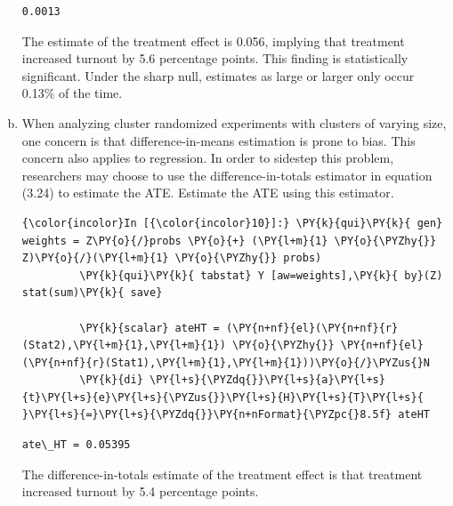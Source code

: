 \documentclass[11pt,notitlepage]{article}\usepackage[]{graphicx}\usepackage[]{color}
\makeatletter
\newenvironment{kframe}{%
 \def\at@end@of@kframe{}%
 \ifinner\ifhmode%
  \def\at@end@of@kframe{\end{minipage}}%
  \begin{minipage}{\columnwidth}%
 \fi\fi%
 \def\FrameCommand##1{\hskip\@totalleftmargin \hskip-\fboxsep
 \colorbox{shadecolor}{##1}\hskip-\fboxsep
     \hskip-\linewidth \hskip-\@totalleftmargin \hskip\columnwidth}%
 \MakeFramed {\advance\hsize-\width
   \@totalleftmargin\z@ \linewidth\hsize
   \@setminipage}}%
 {\par\unskip\endMakeFramed%
 \at@end@of@kframe}
\newenvironment{knitrout}{}{} %
\makeatother
\begin{document}
\begin{enumerate}[a)]
\begin{knitrout}
\begin{kframe}
    \begin{Verbatim}[commandchars=\\\{\}]
  0.0013
    \end{Verbatim}
\end{kframe}
\end{knitrout}

The estimate of the treatment effect is 0.056, implying that treatment increased turnout by 5.6 percentage points. This finding is statistically significant. Under the sharp null, estimates as large or larger only occur 0.13\% of the time.

\item When analyzing cluster randomized experiments with clusters of varying size, one concern is that difference-in-means estimation is prone to bias. This concern also applies to regression.  In order to sidestep this problem, researchers may choose to use the difference-in-totals estimator in equation (3.24) to estimate the ATE. Estimate the ATE using this estimator.

\begin{knitrout}
\color{fgcolor}\begin{kframe}
\begin{Verbatim}[commandchars=\\\{\}]
{\color{incolor}In [{\color{incolor}10}]:} \PY{k}{qui}\PY{k}{ gen} weights = Z\PY{o}{/}probs \PY{o}{+} (\PY{l+m}{1} \PY{o}{\PYZhy{}} Z)\PY{o}{/}(\PY{l+m}{1} \PY{o}{\PYZhy{}} probs)
         \PY{k}{qui}\PY{k}{ tabstat} Y [aw=weights],\PY{k}{ by}(Z)  stat(sum)\PY{k}{ save}
         
         \PY{k}{scalar} ateHT = (\PY{n+nf}{el}(\PY{n+nf}{r}(Stat2),\PY{l+m}{1},\PY{l+m}{1}) \PY{o}{\PYZhy{}} \PY{n+nf}{el}(\PY{n+nf}{r}(Stat1),\PY{l+m}{1},\PY{l+m}{1}))\PY{o}{/}\PYZus{}N
         \PY{k}{di} \PY{l+s}{\PYZdq{}}\PY{l+s}{a}\PY{l+s}{t}\PY{l+s}{e}\PY{l+s}{\PYZus{}}\PY{l+s}{H}\PY{l+s}{T}\PY{l+s}{ }\PY{l+s}{=}\PY{l+s}{\PYZdq{}}\PY{n+nFormat}{\PYZpc{}8.5f} ateHT
\end{Verbatim}

    \begin{Verbatim}[commandchars=\\\{\}]
ate\_HT = 0.05395

    \end{Verbatim}
\end{kframe}
\end{knitrout}

The difference-in-totals estimate of the treatment effect is that treatment increased turnout by 5.4 percentage points.


\end{enumerate}
\end{document}
